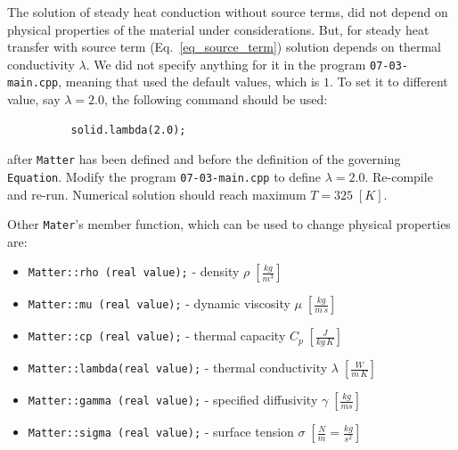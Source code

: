 The solution of steady heat conduction without source terms, did not depend on
physical properties of the material under considerations. But, for steady heat 
transfer with source term (Eq.~\ref{eq_source_term}) solution depends on
thermal conductivity $\lambda$. We did not specify anything for it in the
program {\tt 07-03-main.cpp}, meaning that {\psiboil} used the default 
values, which is $1$. To set it to different value, say $\lambda = 2.0$, the
following command should be used:
%
{\small \begin{verbatim}
          solid.lambda(2.0);
\end{verbatim}}
%
after {\tt Matter} has been defined and before the definition of the
governing {\tt Equation}. 
%
Modify the program {\tt 07-03-main.cpp} to define  $\lambda = 2.0$. 
Re-compile and re-run. Numerical solution should reach maximum $T = 325 \; [K]$. 

Other {\tt Mater}'s member function, which can be used to change physical properties 
are:
%
\begin{itemize}
  \item {\tt Matter::rho   (real value);} - density              $\rho \; [\frac{kg}{m^3}]$
  \item {\tt Matter::mu    (real value);} - dynamic viscosity    $\mu \; [\frac{kg}{m \, s}]$
  \item {\tt Matter::cp    (real value);} - thermal capacity     $C_p \; [\frac{J}{kg \, K}]$
  \item {\tt Matter::lambda(real value);} - thermal conductivity $\lambda \; [\frac{W}{m \, K}]$
  \item {\tt Matter::gamma (real value);} - specified diffusivity  $\gamma \; [\frac{kg}{ms}]$ 
  \item {\tt Matter::sigma (real value);} - surface tension      $\sigma \; [\frac{N}{m} = \frac{kg}{s^2}]$
\end{itemize}

